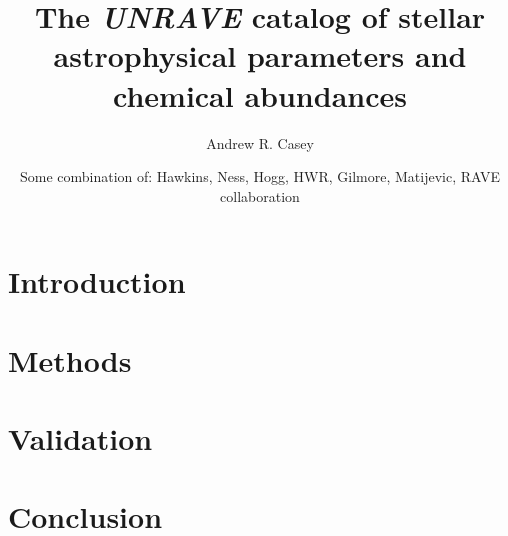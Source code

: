 \documentclass[preprint2,trackchanges]{aastex}
\newcommand{\project}[1]{\textsl{#1}}
\begin{document}
\title{The \project{UNRAVE} catalog of stellar astrophysical parameters and chemical abundances}

\author{Andrew R. Casey}

\author{Some combination of: Hawkins, Ness, Hogg, HWR, Gilmore, Matijevic, RAVE collaboration}

\begin{abstract}

\end{abstract}

\keywords{}

\section{Introduction} 
\label{sec:introduction}


\section{Methods}
\label{sec:methods}


\section{Validation}
\label{sec:validation}


\section{Conclusion}
\label{sec:conclusion}


\acknowledgements
\end{document}
